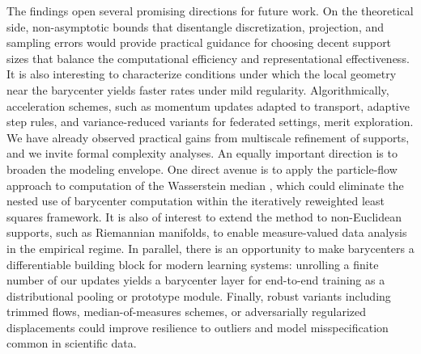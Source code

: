 \documentclass[11pt]{article}
\begin{document}
The findings open several promising directions for future work. On the theoretical side, non-asymptotic bounds that disentangle discretization, projection, and sampling errors would provide practical guidance for choosing decent support sizes that balance the computational efficiency and representational effectiveness. It is also interesting to characterize conditions under which the local geometry near the barycenter yields faster rates under mild regularity. Algorithmically, acceleration schemes, such as momentum updates adapted to transport, adaptive step rules, and variance-reduced variants for federated settings, merit exploration. We have already observed practical gains from multiscale refinement of supports, and we invite formal complexity analyses. An equally important direction is to broaden the modeling envelope. One direct avenue is to apply the particle-flow approach to computation of the Wasserstein median \citep{you_2025_WassersteinMedianProbability}, which could eliminate the nested use of barycenter computation within the iteratively reweighted least squares framework. It is also of interest to extend the method to non-Euclidean supports, such as Riemannian manifolds, to enable measure-valued data analysis in the empirical regime. In parallel, there is an opportunity to make barycenters a differentiable building block for modern learning systems: unrolling a finite number of our updates yields a barycenter layer for end-to-end training as a distributional pooling or prototype module. Finally, robust variants including trimmed flows, median-of-measures schemes, or adversarially regularized displacements could improve resilience to outliers and model misspecification common in scientific data.







\end{document}

